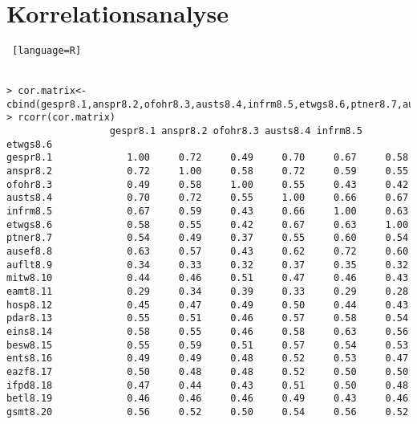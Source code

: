 \section{Korrelationsanalyse}
\label{B}
\begin{lstlisting} [language=R]


> cor.matrix<-cbind(gespr8.1,anspr8.2,ofohr8.3,austs8.4,infrm8.5,etwgs8.6,ptner8.7,ausef8.8,auflt8.9,mitw8.10,eamt8.11,hosp8.12,pdar8.13,eins8.14,besw8.15,ents8.16,eazf8.17,ifpd8.18,betl8.19,gsmt8.20)
> rcorr(cor.matrix)
                  gespr8.1 anspr8.2 ofohr8.3 austs8.4 infrm8.5 etwgs8.6
gespr8.1             1.00     0.72     0.49     0.70     0.67     0.58
anspr8.2             0.72     1.00     0.58     0.72     0.59     0.55
ofohr8.3             0.49     0.58     1.00     0.55     0.43     0.42
austs8.4             0.70     0.72     0.55     1.00     0.66     0.67
infrm8.5             0.67     0.59     0.43     0.66     1.00     0.63
etwgs8.6             0.58     0.55     0.42     0.67     0.63     1.00
ptner8.7             0.54     0.49     0.37     0.55     0.60     0.54
ausef8.8             0.63     0.57     0.43     0.62     0.72     0.60
auflt8.9             0.34     0.33     0.32     0.37     0.35     0.32
mitw8.10             0.44     0.46     0.51     0.47     0.46     0.43
eamt8.11             0.29     0.34     0.39     0.33     0.29     0.28
hosp8.12             0.45     0.47     0.49     0.50     0.44     0.43
pdar8.13             0.55     0.51     0.46     0.57     0.58     0.54
eins8.14             0.58     0.55     0.46     0.58     0.63     0.56
besw8.15             0.55     0.59     0.51     0.57     0.54     0.53
ents8.16             0.49     0.49     0.48     0.52     0.53     0.47
eazf8.17             0.50     0.48     0.48     0.52     0.50     0.50
ifpd8.18             0.47     0.44     0.43     0.51     0.50     0.48
betl8.19             0.46     0.46     0.46     0.49     0.43     0.46
gsmt8.20             0.56     0.52     0.50     0.54     0.56     0.52


\end{lstlisting}
